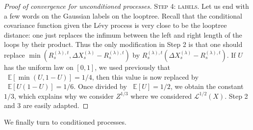 \documentclass[british, a4paper,11pt]{article}
\numberwithin{equation}{section}
\theoremstyle{definition}
\newcommand{\E}{\mathop{}\!\mathbb{E}}
\newcommand{\Loop}{\mathscr{L}}
\begin{document}
\begin{proof}[Proof of convergence for unconditioned processes]
\textsc{Step 4: labels.}
Let us end with a few words on the Gaussian labels on the looptree. Recall that the conditional covariance function given the L\'evy process is very close to be the looptree distance: one just replaces the infimum between the left and right length of the loops by their product. Thus the only modification in Step 2 is that one should replace $\min(R^{(\lambda), t}_s, \Delta X^{(\lambda)}_s-R^{(\lambda), t}_s)$ by $R^{(\lambda), t}_s (\Delta X^{(\lambda)}_s-R^{(\lambda), t}_s)$. If $U$ has the uniform law on $[0,1]$, we used previously that $\E[\min(U, 1-U)] = 1/4$, then this value is now replaced by $\E[U (1-U)] = 1/6$. Once divided by $\E[U]=1/2$, we obtain the constant $1/3$, which explains why we consider $Z^{1/3}$ where we considered $\Loop^{1/2}(X)$.
Step 2 and 3 are easily adapted.
\end{proof}

We finally turn to conditioned processes.
\end{document}
